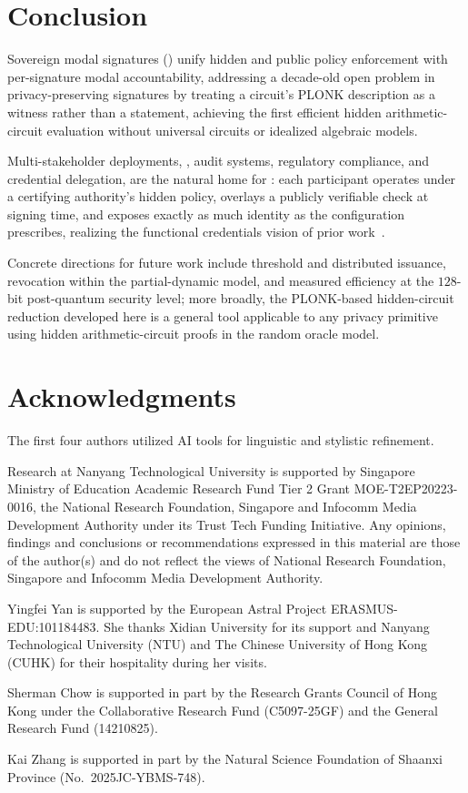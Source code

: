 \documentclass[runningheads]{llncs}
\begin{document}
\section{Conclusion}\label{section:conclusion}
Sovereign modal signatures (\SMS) unify hidden and public policy enforcement
with per-signature modal accountability,
addressing a decade-old open problem in privacy-preserving signatures
by treating a circuit's PLONK description as a witness rather than a statement,
achieving the first efficient hidden arithmetic-circuit evaluation
without universal circuits or idealized algebraic models.

Multi-stakeholder deployments, \eg, audit systems, regulatory compliance,
and credential delegation, are the natural home for \SMS:
each participant operates under a certifying authority's hidden policy,
overlays a publicly verifiable check at signing time,
and exposes exactly as much identity as the configuration prescribes,
realizing the functional credentials vision of prior work~\cite{iotpts/Chow16}.

Concrete directions for future work include threshold and distributed issuance,
revocation within the partial-dynamic model,
and measured efficiency at the $128$-bit post-quantum security level;
more broadly, the PLONK-based hidden-circuit reduction developed here
is a general tool applicable to any privacy primitive
using hidden arithmetic-circuit proofs in the random oracle model.

\section*{Acknowledgments}
The first four authors utilized AI tools for linguistic and stylistic refinement.

Research at Nanyang Technological University is supported by Singapore Ministry of Education Academic Research Fund Tier 2 Grant MOE-T2EP20223-0016, the National Research Foundation, Singapore and Infocomm Media Development Authority under its Trust Tech Funding Initiative.
Any opinions, findings and conclusions or recommendations expressed in this material are those of the author(s) and do not reflect the views of National Research Foundation, Singapore and Infocomm Media Development Authority.

Yingfei Yan is supported by the European Astral Project ERASMUS-EDU:101184483.
She thanks Xidian University for its support and Nanyang Technological University (NTU) and The Chinese University of Hong Kong (CUHK) for their hospitality during her visits.

Sherman Chow is supported in part by the Research Grants Council of Hong Kong under the Collaborative Research Fund (C5097-25GF) and the General Research Fund (14210825).

Kai Zhang is supported in part by the Natural Science Foundation of Shaanxi Province (No.\ 2025JC-YBMS-748).

	
	
\end{document}
